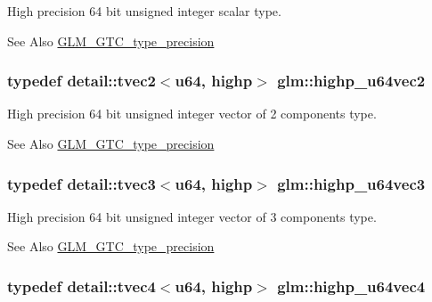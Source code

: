 High precision 64 bit unsigned integer scalar type. \begin{DoxySeeAlso}{See Also}
\hyperlink{group__gtc__type__precision}{G\-L\-M\-\_\-\-G\-T\-C\-\_\-type\-\_\-precision} 
\end{DoxySeeAlso}
\hypertarget{group__gtc__type__precision_gad11667a4764867732a89791ec2a01aeb}{
\subsubsection[{highp\-\_\-u64vec2}]{\setlength{\rightskip}{0pt plus 5cm}typedef detail\-::tvec2$<$u64, highp$>$ {\bf glm\-::highp\-\_\-u64vec2}}}\label{group__gtc__type__precision_gad11667a4764867732a89791ec2a01aeb}
High precision 64 bit unsigned integer vector of 2 components type. \begin{DoxySeeAlso}{See Also}
\hyperlink{group__gtc__type__precision}{G\-L\-M\-\_\-\-G\-T\-C\-\_\-type\-\_\-precision} 
\end{DoxySeeAlso}
\hypertarget{group__gtc__type__precision_ga3cb5c038f8cba0dfb894af66b7b2ba13}{
\subsubsection[{highp\-\_\-u64vec3}]{\setlength{\rightskip}{0pt plus 5cm}typedef detail\-::tvec3$<$u64, highp$>$ {\bf glm\-::highp\-\_\-u64vec3}}}\label{group__gtc__type__precision_ga3cb5c038f8cba0dfb894af66b7b2ba13}
High precision 64 bit unsigned integer vector of 3 components type. \begin{DoxySeeAlso}{See Also}
\hyperlink{group__gtc__type__precision}{G\-L\-M\-\_\-\-G\-T\-C\-\_\-type\-\_\-precision} 
\end{DoxySeeAlso}
\hypertarget{group__gtc__type__precision_ga8aa6fc9f16dfa3078d411f6361188a45}{
\subsubsection[{highp\-\_\-u64vec4}]{\setlength{\rightskip}{0pt plus 5cm}typedef detail\-::tvec4$<$u64, highp$>$ {\bf glm\-::highp\-\_\-u64vec4}}}\label{group__gtc__type__precision_ga8aa6fc9f16dfa3078d411f6361188a45}

